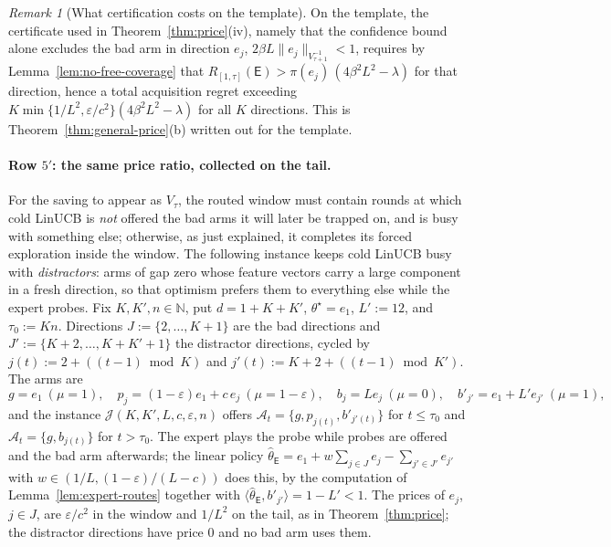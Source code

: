 \documentclass{article}
\theoremstyle{definition}
\theoremstyle{remark}
\newtheorem{remark}{Remark}
\newcommand{\N}{\mathbb{N}}
\newcommand{\eps}{\varepsilon}
\theoremstyle{remark}
\newcommand{\Exp}{\mathsf{E}}
\begin{document}
\begin{remark}[What certification costs on the template]
On the template, the certificate used in Theorem~\ref{thm:price}(iv), namely
that the confidence bound alone excludes the bad arm in direction $e_j$,
$2\beta L\|e_j\|_{V_{\tau+1}^{-1}}<1$, requires by
Lemma~\ref{lem:no-free-coverage} that
$R_{[1,\tau]}(\Exp)>\pi(e_j)\,(4\beta^2L^2-\lambda)$ for that direction, hence
a total acquisition regret exceeding
$K\min\{1/L^2,\eps/c^2\}(4\beta^2L^2-\lambda)$ for all $K$ directions. This is
Theorem~\ref{thm:general-price}(b) written out for the template.
\end{remark}

\paragraph{Row $5'$: the same price ratio, collected on the tail.}
For the saving to appear as $V_\tau$, the routed window must contain rounds
at which cold LinUCB is \emph{not} offered the bad arms it will later be
trapped on, and is busy with something else; otherwise, as just explained, it
completes its forced exploration inside the window. The following instance
keeps cold LinUCB busy with \emph{distractors}: arms of gap zero whose
feature vectors carry a large component in a fresh direction, so that
optimism prefers them to everything else while the expert probes. Fix
$K,K',n\in\N$, put $d=1+K+K'$, $\theta^\star=e_1$, $L':=12$, and
$\tau_0:=Kn$. Directions $J:=\{2,\dots,K+1\}$ are the bad directions and
$J':=\{K+2,\dots,K+K'+1\}$ the distractor directions, cycled by
$j(t):=2+((t-1)\bmod K)$ and $j'(t):=K+2+((t-1)\bmod K')$. The arms are
\[
g=e_1\ (\mu=1),\quad p_j=(1-\eps)e_1+c\,e_j\ (\mu=1-\eps),\quad
b_j=Le_j\ (\mu=0),\quad b'_{j'}=e_1+L'e_{j'}\ (\mu=1),
\]
and the instance $\mathcal J(K,K',L,c,\eps,n)$ offers
$\mathcal A_t=\{g,p_{j(t)},b'_{j'(t)}\}$ for $t\le\tau_0$ and
$\mathcal A_t=\{g,b_{j(t)}\}$ for $t>\tau_0$. The expert plays the probe while
probes are offered and the bad arm afterwards; the linear policy
$\widehat\theta_{\Exp}=e_1+w\sum_{j\in J}e_j-\sum_{j'\in J'}e_{j'}$ with
$w\in(1/L,(1-\eps)/(L-c))$ does this, by the computation of
Lemma~\ref{lem:expert-routes} together with $\langle\widehat\theta_{\Exp},b'_{j'}\rangle=1-L'<1$.
The prices of $e_j$, $j\in J$, are $\eps/c^2$ in the window and $1/L^2$ on
the tail, as in Theorem~\ref{thm:price}; the distractor directions have
price $0$ and no bad arm uses them.
\end{document}
